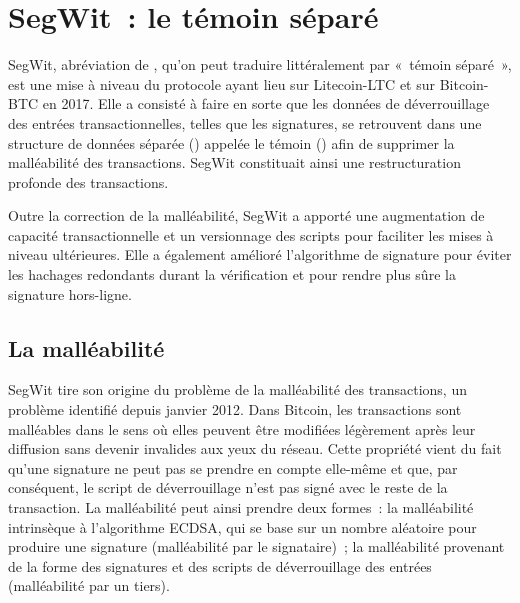 \section*{SegWit~: le témoin séparé}

SegWit, abréviation de , qu'on peut traduire littéralement par «~témoin séparé~», est une mise à niveau du protocole ayant lieu sur Litecoin-LTC et sur Bitcoin-BTC en 2017. Elle a consisté à faire en sorte que les données de déverrouillage des entrées transactionnelles, telles que les signatures, se retrouvent dans une structure de données séparée () appelée le témoin () afin de supprimer la malléabilité des transactions. SegWit constituait ainsi une restructuration profonde des transactions.

Outre la correction de la malléabilité, SegWit a apporté une augmentation de capacité transactionnelle et un versionnage des scripts pour faciliter les mises à niveau ultérieures. Elle a également amélioré l'algorithme de signature pour éviter les hachages redondants durant la vérification et pour rendre plus sûre la signature hors-ligne.


\subsection{La malléabilité} SegWit tire son origine du problème de la malléabilité des transactions, un problème identifié depuis janvier 2012. Dans Bitcoin, les transactions sont malléables dans le sens où elles peuvent être modifiées légèrement après leur diffusion sans devenir invalides aux yeux du réseau. Cette propriété vient du fait qu'une signature ne peut pas se prendre en compte elle-même et que, par conséquent, le script de déverrouillage n'est pas signé avec le reste de la transaction. La malléabilité peut ainsi prendre deux formes~: la malléabilité intrinsèque à l'algorithme ECDSA, qui se base sur un nombre aléatoire pour produire une signature (malléabilité par le signataire)~; la malléabilité provenant de la forme des signatures et des scripts de déverrouillage des entrées (malléabilité par un tiers).

